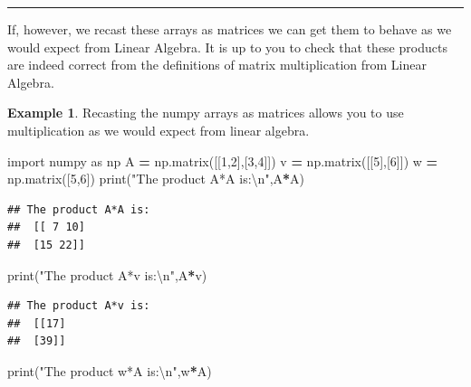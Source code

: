 \documentclass[
]{book}
\newenvironment{Shaded}{\begin{snugshade}}{\end{snugshade}}
\newcommand{\BuiltInTok}[1]{#1}
\newcommand{\CharTok}[1]{\textcolor[rgb]{0.31,0.60,0.02}{#1}}
\newcommand{\DecValTok}[1]{\textcolor[rgb]{0.00,0.00,0.81}{#1}}
\newcommand{\ImportTok}[1]{#1}
\newcommand{\NormalTok}[1]{#1}
\newcommand{\OperatorTok}[1]{\textcolor[rgb]{0.81,0.36,0.00}{\textbf{#1}}}
\newcommand{\StringTok}[1]{\textcolor[rgb]{0.31,0.60,0.02}{#1}}
\theoremstyle{definition}
\theoremstyle{definition}
\newtheorem{example}{Example}[chapter]
\theoremstyle{definition}
\theoremstyle{remark}
\begin{document}
\begin{center}\rule{0.5\linewidth}{0.5pt}\end{center}

If, however, we recast these arrays as matrices we can get them to behave as we would expect from Linear Algebra. It is up to you to check that these products are indeed correct from the definitions of matrix multiplication from Linear Algebra.

\begin{example}
\protect\hypertarget{exm:unnamed-chunk-727}{}{\label{exm:unnamed-chunk-727} }Recasting the numpy arrays as matrices allows you to use multiplication as we would expect from linear algebra.
\end{example}

\begin{Shaded}
\begin{Highlighting}[]
\ImportTok{import}\NormalTok{ numpy }\ImportTok{as}\NormalTok{ np}
\NormalTok{A }\OperatorTok{=}\NormalTok{ np.matrix([[}\DecValTok{1}\NormalTok{,}\DecValTok{2}\NormalTok{],[}\DecValTok{3}\NormalTok{,}\DecValTok{4}\NormalTok{]])}
\NormalTok{v }\OperatorTok{=}\NormalTok{ np.matrix([[}\DecValTok{5}\NormalTok{],[}\DecValTok{6}\NormalTok{]])}
\NormalTok{w }\OperatorTok{=}\NormalTok{ np.matrix([}\DecValTok{5}\NormalTok{,}\DecValTok{6}\NormalTok{])}
\BuiltInTok{print}\NormalTok{(}\StringTok{"The product A*A is:}\CharTok{\textbackslash{}n}\StringTok{"}\NormalTok{,A}\OperatorTok{*}\NormalTok{A)}
\end{Highlighting}
\end{Shaded}

\begin{verbatim}
## The product A*A is:
##  [[ 7 10]
##  [15 22]]
\end{verbatim}

\begin{Shaded}
\begin{Highlighting}[]
\BuiltInTok{print}\NormalTok{(}\StringTok{"The product A*v is:}\CharTok{\textbackslash{}n}\StringTok{"}\NormalTok{,A}\OperatorTok{*}\NormalTok{v)}
\end{Highlighting}
\end{Shaded}

\begin{verbatim}
## The product A*v is:
##  [[17]
##  [39]]
\end{verbatim}

\begin{Shaded}
\begin{Highlighting}[]
\BuiltInTok{print}\NormalTok{(}\StringTok{"The product w*A is:}\CharTok{\textbackslash{}n}\StringTok{"}\NormalTok{,w}\OperatorTok{*}\NormalTok{A)}
\end{Highlighting}
\end{Shaded}
\end{document}
